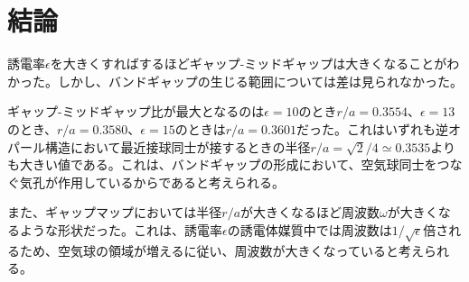\documentclass[platex,dvipdfmx]{jsreport}
\numberwithin{equation}{section}
\begin{document}
\chapter{結論}

誘電率$\epsilon$を大きくすればするほどギャップ-ミッドギャップは大きくなることがわかった。しかし、バンドギャップの生じる範囲については差は見られなかった。

ギャップ-ミッドギャップ比が最大となるのは$\epsilon = 10$のとき$r / a = 0.3554$、$\epsilon = 13$のとき、$r / a = 0.3580$、$\epsilon = 15$のときは$r / a = 0.3601$だった。これはいずれも逆オパール構造において最近接球同士が接するときの半径$r / a = \sqrt{2} / 4 \simeq 0.3535$よりも大きい値である。これは、バンドギャップの形成において、空気球同士をつなぐ気孔が作用しているからであると考えられる。

また、ギャップマップにおいては半径$r / a$が大きくなるほど周波数$\omega$が大きくなるような形状だった。これは、誘電率$\epsilon$の誘電体媒質中では周波数は$1 / \sqrt{\epsilon} $倍されるため、空気球の領域が増えるに従い、周波数が大きくなっていると考えられる。




\end{document}
